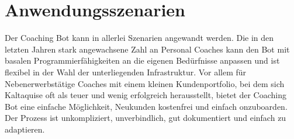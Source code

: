 \label{Anwendungsszenarien}
\chapter{Anwendungsszenarien}

Der Coaching Bot kann in allerlei Szenarien angewandt werden. Die in den letzten Jahren stark angewachsene Zahl an Personal Coaches kann den Bot mit basalen Programmierfähigkeiten an die eigenen Bedürfnisse anpassen und ist flexibel in der Wahl der unterliegenden Infrastruktur. Vor allem für Nebenerwerbstätige Coaches mit einem kleinen Kundenportfolio, bei dem sich Kaltaquise oft als teuer und wenig erfolgreich herausstellt, bietet der Coaching Bot eine einfache Möglichkeit, Neukunden kostenfrei und einfach onzuboarden. Der Prozess ist unkompliziert, unverbindlich, gut dokumentiert und einfach zu adaptieren. 


